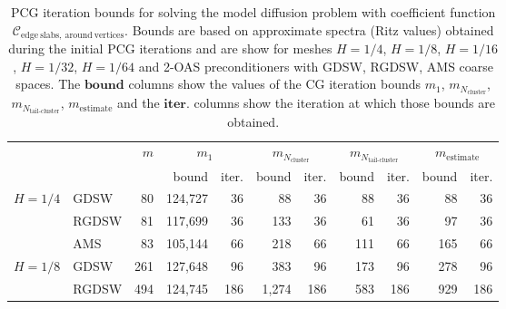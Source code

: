 \begin{table}[H]
\centering
\caption{PCG iteration bounds for solving the model diffusion problem with coefficient function $\mathcal{C}_{\mathrm{edge \ slabs, \ around \ vertices}}$. Bounds are based on approximate spectra (Ritz values) obtained during the initial PCG iterations and are show for meshes $H=1/4$, $H=1/8$, $H=1/16$, $H=1/32$, $H=1/64$ and 2-OAS preconditioners with GDSW, RGDSW, AMS coarse spaces. The $\textbf{bound}$ columns show the values of the CG iteration bounds $m_1$, $m_{N_{\text{cluster}}}$, $m_{N_{\text{tail-cluster}}}$, $m_{\text{estimate}}$ and the $\textbf{iter.}$ columns show the iteration at which those bounds are obtained.}
\label{tab:cg_iteration_bound_coef=slabs_around_vertices}
\begin{tabular}{llrrrrrrrrr}
\toprule
 &  & \bfseries $m$ & \multicolumn{2}{|c|}{\bfseries $m_1$} & \multicolumn{2}{|c|}{\bfseries $m_{N_{\text{cluster}}}$} & \multicolumn{2}{|c|}{\bfseries $m_{N_{\text{tail-cluster}}}$} & \multicolumn{2}{|c|}{\bfseries $m_{\text{estimate}}$} \\
 &  &  & bound & iter. & bound & iter. & bound & iter. & bound & iter. \\
\midrule
\multirow[c]{3}{*}{\bfseries $H=1/4$} & GDSW & 80 & {\cellcolor[HTML]{379E54}} \color[HTML]{F1F1F1} 124,727 & 36 & {\cellcolor[HTML]{BCE395}} \color[HTML]{000000} 88 & 36 & {\cellcolor[HTML]{FFFFE5}} \color[HTML]{000000} 88 & 36 & {\cellcolor[HTML]{004529}} \color[HTML]{F1F1F1} 88 & 36 \\
\cline{2-11}
\bfseries  & RGDSW & 81 & {\cellcolor[HTML]{FFFFE5}} \color[HTML]{000000} 117,699 & 36 & {\cellcolor[HTML]{BCE395}} \color[HTML]{000000} 133 & 36 & {\cellcolor[HTML]{379E54}} \color[HTML]{F1F1F1} 61 & 36 & {\cellcolor[HTML]{004529}} \color[HTML]{F1F1F1} 97 & 36 \\
\cline{2-11}
\bfseries  & AMS & 83 & {\cellcolor[HTML]{BCE395}} \color[HTML]{000000} 105,144 & 66 & {\cellcolor[HTML]{FFFFE5}} \color[HTML]{000000} 218 & 66 & {\cellcolor[HTML]{379E54}} \color[HTML]{F1F1F1} 111 & 66 & {\cellcolor[HTML]{004529}} \color[HTML]{F1F1F1} 165 & 66 \\
\cline{1-11} \cline{2-11}
\multirow[c]{3}{*}{\bfseries $H=1/8$} & GDSW & 261 & {\cellcolor[HTML]{FFFFE5}} \color[HTML]{000000} 127,648 & 96 & {\cellcolor[HTML]{BCE395}} \color[HTML]{000000} 383 & 96 & {\cellcolor[HTML]{379E54}} \color[HTML]{F1F1F1} 173 & 96 & {\cellcolor[HTML]{004529}} \color[HTML]{F1F1F1} 278 & 96 \\
\cline{2-11}
\bfseries  & RGDSW & 494 & {\cellcolor[HTML]{BCE395}} \color[HTML]{000000} 124,745 & 186 & {\cellcolor[HTML]{FFFFE5}} \color[HTML]{000000} 1,274 & 186 & {\cellcolor[HTML]{379E54}} \color[HTML]{F1F1F1} 583 & 186 & {\cellcolor[HTML]{004529}} \color[HTML]{F1F1F1} 929 & 186 \\

\end{tabular}
\end{table}

